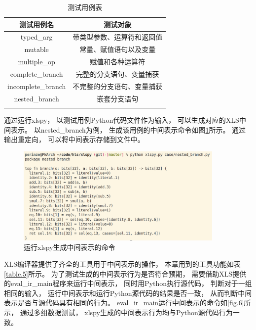 \begin{table}[ht]
\begin{center}
\caption{测试用例表}

\begin{tabular}{ c c }
    \Xhline{3\arrayrulewidth}
    测试用例名             & 测试对象 \\
    \hline
    typed\_arg           & 带类型参数、运算符和返回值 \\
    mutable              & 常量、赋值语句以及变量 \\
    multiple\_op         & 赋值和各种运算符 \\
    complete\_branch     & 完整的分支语句、变量捕获 \\
    incomplete\_branch   & 不完整的分支语句、变量捕获 \\
    nested\_branch       & 嵌套分支语句 \\
    \Xhline{3\arrayrulewidth}
\end{tabular}

\label{table.2}
\end{center}
\end{table}

通过运行xlspy，
以测试用例Python代码文件作为输入，
可以生成对应的XLS中间表示。
以nested\_branch为例，
生成该用例的中间表示命令如图\ref{fig.5}所示。
通过输出重定向，
可以将中间表示存储到文件中。

\begin{figure}[h]
\centering 
\includegraphics[width=0.9\textwidth]{figure/xlspy_command.png}
\caption{运行xlspy生成中间表示的命令}
\label{fig.5}
\end{figure}

XLS编译器提供了齐全的工具用于中间表示的操作，
本章用到的工具功能如表\ref{table.5}所示。
为了测试生成的中间表示行为是否符合预期，
需要借助XLS提供的eval\_ir\_main程序来运行中间表示，
同时用Python执行源代码，
判断对于一组相同的输入，
运行中间表示和运行Python源代码的结果是否一致，
从而判断中间表示是否与源代码具有相同的行为。
eval\_ir\_main运行中间表示的命令如\ref{fig.6}所示，
通过多组数据测试，
xlspy生成的中间表示行为均与Python源代码行为一致。

